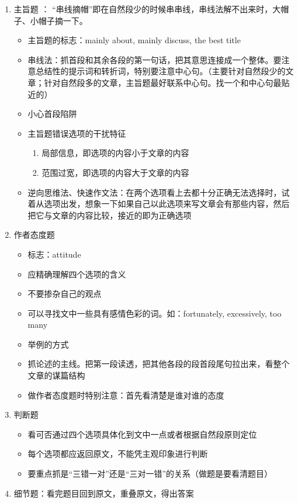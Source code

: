 \documentclass[11pt,twoside,openany,x11names,svgnames]{memoir}
\newcommand{\hei}{\CJKfamily{hei}}      %
\begin{document}
\begin{enumerate}
{\hei 注意}：做题时不能想得太多，推得过远。是否把原文读懂才是关键。
\item 主旨题 ： “串线摘帽”即在自然段少的时候串串线，串线法解不出来时，大帽子、小帽子摘一下。
\begin{itemize}
  \item 主旨题的标志：mainly about, mainly discuss, the best title
  \item 串线法：抓首段和其余各段的第一句话，把其意思连接成一个整体。要注意总结性的提示词和转折词，特别要注意中心句。（主要针对自然段少的文章；针对自然段多的文章，主旨题最好联系中心句。找一个和中心句最贴近的）
  \item 小心首段陷阱
  \item 主旨题错误选项的干扰特征
  \begin{enumerate}[(1)]
  \item 局部信息，即选项的内容小于文章的内容
  \item 范围过宽，即选项的内容大于文章的内容
\end{enumerate}
  \item 逆向思维法、快速作文法：在两个选项看上去都十分正确无法选择时，试着从选项出发，想象一下如果自己以此选项来写文章会有那些内容，然后把它与文章的内容比较，接近的即为正确选项
\end{itemize}
\item 作者态度题
\begin{itemize}
  \item 标志：attitude
  \item 应精确理解四个选项的含义
  \item 不要掺杂自己的观点
  \item 可以寻找文中一些具有感情色彩的词。如：fortunately, excessively, too many
  \item 举例的方式
  \item 抓论述的主线。把第一段读透，把其他各段的段首段尾句拉出来，看整个文章的谋篇结构
  \item 做作者态度题时特别注意：首先看清楚是谁对谁的态度
\end{itemize}
\item 判断题
\begin{itemize}
  \item 看可否通过四个选项具体化到文中一点或者根据自然段原则定位
  \item 每个选项都应返回原文，不能凭主观印象进行判断
  \item 要重点抓是“三错一对”还是“三对一错”的关系（做题是要看清题目）
\end{itemize}
\item 细节题：看完题目回到原文，重叠原文，得出答案

\end{enumerate}
\end{document}
